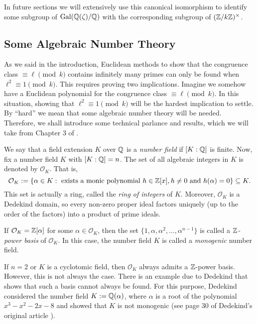 \documentclass[../main.tex]{subfiles}
\begin{document}
In future sections we will extensively use this canonical isomorphism to identify some subgroup of $\operatorname{Gal}(\mathbb{Q}(\zeta)/\mathbb{Q})$ with the corresponding subgroup of $(\mathbb{Z}/k\mathbb{Z})^\times$.

\subsection{Some Algebraic Number Theory}\label{sec:ANT}

As we said in the introduction, Euclidean methods to show that the congruence class $\equiv \ell\pmod{k}$ contains infinitely many primes can only be found when $\ell^2\equiv 1\pmod{k}$. This requires proving two implications. Imagine we somehow have a Euclidean polynomial for the congruence class $\equiv\ell\pmod{k}$. In this situation, showing that $\ell^2\equiv 1\pmod{k}$ will be the hardest implication to settle. By ``hard'' we mean that some algebraic number theory will be needed. Therefore, we shall introduce some technical parlance and results, which we will take from Chapter $3$ of \cite{Marcus}.

We say that a field extension $K$ over $\mathbb{Q}$ is a \emph{number field} if $[K:\mathbb{Q}]$ is finite. Now, fix a number field $K$ with $[K:\mathbb{Q}]=n$. The set of all algebraic integers in $K$ is denoted by $\mathcal{O}_K$. That is, 
	\begin{equation*}
	\mathcal{O}_K:=\{\alpha\in K: \ \text{exists a monic polynomial} \ h\in \Z[x], h\neq 0 \ \text{and} \ h(\alpha)=0\}\subseteq K.
	\end{equation*}
This set is actually a ring, called the \emph{ring of integers} of $K$. Moreover, $\mathcal{O}_K$ is a Dedekind domain, so every non-zero proper ideal factors uniquely (up to the order of the factors) into a product of prime ideals.

If $\mathcal{O}_K=\mathbb{Z}[\alpha]$ for some $\alpha\in\mathcal{O}_K$, then the set $\{1,\alpha,\alpha^2,\dots,\alpha^{n-1}\}$ is called a \emph{$\mathbb{Z}$-power basis} of $\mathcal{O}_K$. In this case, the number field $K$ is called a \emph{monogenic} number field.

If $n=2$ or $K$ is a cyclotomic field, then $\mathcal{O}_K$ always admits a $\mathbb{Z}$-power basis. However, this is not always the case. There is an example due to Dedekind that shows that such a basis cannot always be found. For this purpose, Dedekind considered the number field $K:=\mathbb{Q}(\alpha)$, where $\alpha$ is a root of the polynomial $x^3-x^2-2x-8$ and showed that $K$ is not monogenic (see page $30$ of Dedekind's original article \cite{Dedekind1878}). 
\end{document}
